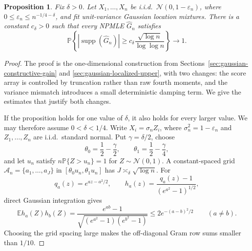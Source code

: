 \documentclass[11pt]{article}
\newtheorem{proposition}[theorem]{Proposition}
\theoremstyle{definition}
\numberwithin{equation}{section}
\newcommand{\cN}{\mathcal{N}}
\newcommand{\wh}{\widehat}
\newcommand{\eps}{\varepsilon}
\DeclareMathOperator{\supp}{supp}
\begin{document}
\begin{proposition}
\label{prop:gaussian-small-variance-mismatch}
Fix \(\delta>0\). Let \(X_1,\dots,X_n\) be i.i.d.\
\(\cN(0,1-\eps_n)\), where
\(0\le\eps_n\le n^{-1/4-\delta}\), and fit unit-variance Gaussian
location mixtures. There is a constant \(c_\delta>0\) such that every
NPMLE \(\wh G_n\) satisfies
\[
    \mathbb P\left\{
        |\supp(\wh G_n)|
        \ge
        c_\delta\frac{\sqrt{\log n}}{\log\log n}
    \right\}\to1.
\]
\end{proposition}

\begin{proof}
The proof is the one-dimensional construction from
Sections~\ref{sec:gaussian-constructive-gain} and
\ref{sec:gaussian-localized-upper}, with two changes: the score array is
controlled by truncation rather than raw fourth moments, and the variance
mismatch introduces a small deterministic damping term. We give the estimates
that justify both changes.

If the proposition holds for one value of \(\delta\), it also holds for every
larger value. We may therefore assume \(0<\delta<1/4\). Write
\(X_i=\sigma_nZ_i\), where \(\sigma_n^2=1-\eps_n\) and
\(Z_1,\ldots,Z_n\) are i.i.d.\ standard normal. Put
\(\gamma=\delta/2\), choose
\[
    \theta_0=\frac12-\frac\gamma2,
    \qquad
    \theta_1=\frac12-\frac\gamma4,
\]
and let \(u_n\) satisfy \(n\mathbb P\{Z>u_n\}=1\) for
\(Z\sim\cN(0,1)\). A constant-spaced grid
\(\mathcal A_n=\{a_1,\dots,a_J\}\) in
\([\theta_0u_n,\theta_1u_n]\) has
\(J\asymp_\delta\sqrt{\log n}\). For
\[
    q_a(z)=e^{az-a^2/2},
    \qquad
    h_a(z)=\frac{q_a(z)-1}{(e^{a^2}-1)^{1/2}},
\]
direct Gaussian integration gives
\[
    \mathbb E h_a(Z)h_b(Z)
    =
    \frac{e^{ab}-1}{\sqrt{(e^{a^2}-1)(e^{b^2}-1)}}
    \le 2e^{-(a-b)^2/2}
    \qquad(a\ne b).
\]
Choosing the grid spacing large makes the off-diagonal Gram row sums smaller
than \(1/10\).


\end{proof}
\end{document}

